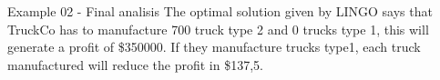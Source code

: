 \begin{frame}{Example 02 - Final analisis}
The optimal solution given by LINGO says that TruckCo has to manufacture 700 truck type 2 and 0 trucks type 1, this will generate a profit of \$350000.
If they manufacture trucks type1, each truck manufactured will reduce the profit in \$137,5.
\end{frame}
